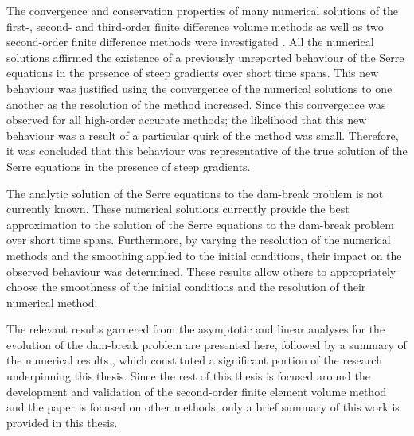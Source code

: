 The convergence and conservation properties of many numerical solutions of the first-, second- and third-order finite difference volume methods as well as two second-order finite difference methods were investigated \cite{Pitt-2018-61}. All the numerical solutions affirmed the existence of a previously unreported behaviour of the Serre equations in the presence of steep gradients over short time spans. This new behaviour was justified using the convergence of the numerical solutions to one another as the resolution of the method increased. Since this convergence was observed for all high-order accurate methods; the likelihood that this new behaviour was a result of a particular quirk of the method was small. Therefore, it was concluded that this behaviour was representative of the true solution of the Serre equations in the presence of steep gradients.

The analytic solution of the Serre equations to the dam-break problem is not currently known. These numerical solutions \cite{Pitt-2018-61} currently provide the best approximation to the solution of the Serre equations to the dam-break problem over short time spans. Furthermore, by varying the resolution of the numerical methods and the smoothing applied to the initial conditions, their impact on the observed behaviour was determined. These results allow others to appropriately choose the smoothness of the initial conditions and the resolution of their numerical method.

The relevant results garnered from the asymptotic \cite{El-etal-2006} and linear \cite{Dougalis-etal-2007} analyses for the evolution of the dam-break problem are presented here, followed by a summary of the numerical results \cite{Pitt-2018-61}, which constituted a significant portion of the research underpinning this thesis. Since the rest of this thesis is focused around the development and validation of the second-order finite element volume method and the paper \cite{Pitt-2018-61} is focused on other methods, only a brief summary of this work is provided in this thesis.

